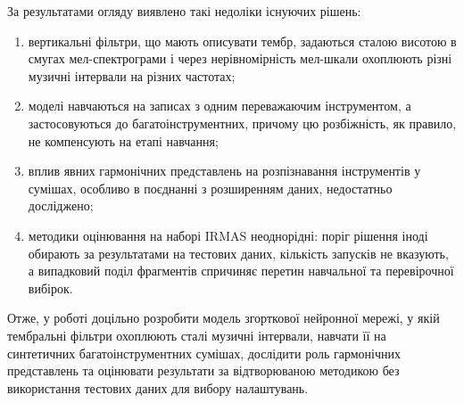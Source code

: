 За результатами огляду виявлено такі недоліки існуючих рішень:
\begin{enumerate}
    \item вертикальні фільтри, що мають описувати тембр, задаються сталою
    висотою в смугах мел-спектрограми і через нерівномірність мел-шкали
    охоплюють різні музичні інтервали на різних частотах;
    \item моделі навчаються на записах з одним переважаючим інструментом, а
    застосовуються до багатоінструментних, причому цю розбіжність, як
    правило, не компенсують на етапі навчання;
    \item вплив явних гармонічних представлень на розпізнавання
    інструментів у сумішах, особливо в поєднанні з розширенням даних,
    недостатньо досліджено;
    \item методики оцінювання на наборі IRMAS неоднорідні: поріг рішення
    іноді обирають за результатами на тестових даних, кількість запусків
    не вказують, а випадковий поділ фрагментів спричиняє перетин
    навчальної та перевірочної вибірок.
\end{enumerate}

Отже, у роботі доцільно розробити модель згорткової нейронної мережі, у
якій тембральні фільтри охоплюють сталі музичні інтервали, навчати її на
синтетичних багатоінструментних сумішах, дослідити роль гармонічних
представлень та оцінювати результати за відтворюваною методикою без
використання тестових даних для вибору налаштувань.
